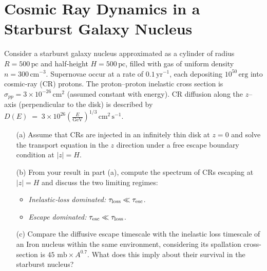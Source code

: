 \section{Cosmic Ray Dynamics in a Starburst Galaxy Nucleus}

\begin{exercise}
Consider a starburst galaxy nucleus approximated as a cylinder of radius \(R = 500\,\mathrm{pc}\) and half‐height \(H = 500\,\mathrm{pc}\), filled with gas of uniform density \(n = 300\,\mathrm{cm}^{-3}\). Supernovae occur at a rate of \(0.1\,\mathrm{yr}^{-1}\), each depositing \(10^{50}\,\mathrm{erg}\) into cosmic‐ray (CR) protons. The proton–proton inelastic cross section is 
\(
\sigma_{pp} = 3 \times 10^{-26}\,\mathrm{cm}^2
\)
(assumed constant with energy). CR diffusion along the \(z\)–axis (perpendicular to the disk) is described by
\(
D(E) \;=\; 3 \times 10^{26} \left(\frac{E}{\mathrm{GeV}}\right)^{1/3} \,\mathrm{cm}^2\,\mathrm{s}^{-1}.
\)

\begin{enumerate}
\item[(a)] Assume that CRs are injected in an infinitely thin disk at \(z = 0\) and solve the transport equation in the \(z\) direction under a free escape boundary condition at \(|z| = H\).
\item[(b)] From your result in part (a), compute the spectrum of CRs escaping at \(|z| = H\) and discuss the two limiting regimes:
\begin{itemize}
\item \emph{Inelastic‐loss dominated:} \(\tau_{\rm loss} \ll \tau_{\rm esc}\).
\item \emph{Escape dominated:} \(\tau_{\rm esc} \ll \tau_{\rm loss}\).
\end{itemize}
\item[(c)] Compare the diffusive escape timescale with the inelastic loss timescale of an Iron nucleus within the same environment, considering its spallation cross-section is \(45 \text{ mb} \times A^{0.7}\). What does this imply about their survival in the starburst nucleus?
\end{enumerate}
\end{exercise}

